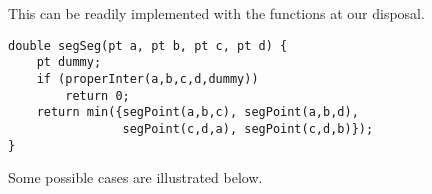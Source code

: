 This can be readily implemented with the functions at our disposal.
\begin{lstlisting}
double segSeg(pt a, pt b, pt c, pt d) {
    pt dummy;
    if (properInter(a,b,c,d,dummy))
        return 0;
    return min({segPoint(a,b,c), segPoint(a,b,d),
                segPoint(c,d,a), segPoint(c,d,b)});
}
\end{lstlisting}

Some possible cases are illustrated below.
